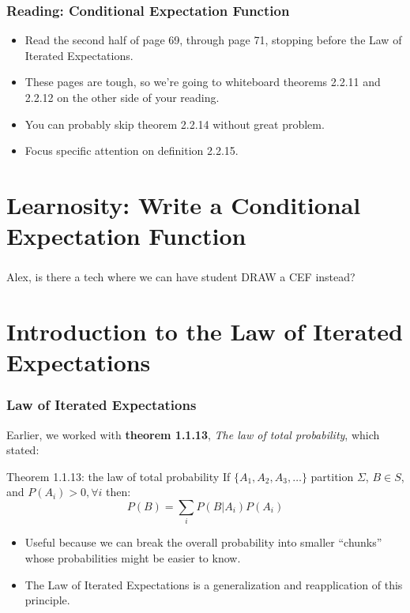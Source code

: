 \documentclass[12pt, block=fill]{beamer}
\newcommand{\paul}[1]{{\color{red}#1}}
\begin{document}
 \begin{frame}
   \frametitle{Reading: Conditional Expectation Function}
   \begin{itemize}
   \item Read the second half of page 69, through page 71, stopping before the Law of Iterated Expectations.
   \item These pages are tough, so we're going to whiteboard
     theorems 2.2.11 and 2.2.12 on the other side of your reading.
   \item You can probably skip theorem 2.2.14 without great problem.
   \item Focus specific attention on definition 2.2.15.
   \end{itemize}
 \end{frame}
 
 
 \section{Learnosity: Write a Conditional Expectation Function}
 
 \begin{frame}
  \frametitle{}
  \paul{Alex, is there a tech where we can have student DRAW a CEF instead?}
\end{frame}


 \section{Introduction to the Law of Iterated Expectations}

 \begin{frame}
   \frametitle{Law of Iterated Expectations}
   Earlier, we worked with \textbf{theorem 1.1.13}, \textit{The law of
     total probability}, which stated:
   
   \begin{block}{Theorem 1.1.13: the law of total probability}
     If $\{A_{1}, A_{2}, A_{3}, \dots\}$ partition $\Sigma$,
     $B \in S$, and $P(A_{i}) > 0, \forall i$ then:
     \[
       P(B) = \sum_{i} P(B|A_{i})P(A_{i})
     \]
   \end{block}
   \begin{itemize}
   \item Useful because we can break the overall probability into
     smaller ``chunks'' whose probabilities might be easier to know. 
   \item The Law of Iterated Expectations is a generalization and reapplication
     of this principle.
   \end{itemize} 
 \end{frame}
\end{document}
